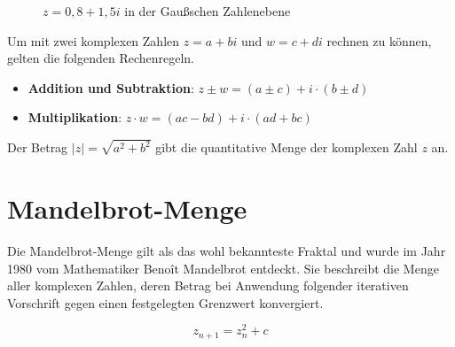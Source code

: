 \begin{figure}[h!]
  \centering
  \caption{$z=0,8 + 1,5i$ in der Gaußschen Zahlenebene}
\end{figure}
\noindent
Um mit zwei komplexen Zahlen $z=a+bi$ und $w=c+di$ rechnen zu können, gelten die folgenden Rechenregeln.
\begin{itemize}
  \item \textbf{Addition und Subtraktion}: $z \pm w = (a \pm c) + i \cdot (b \pm d)$
  \item \textbf{Multiplikation}: $z \cdot w = (ac - bd) + i \cdot (ad + bc)$
\end{itemize}
Der Betrag $\lvert z \rvert = \sqrt{a^{2}+b^{2}} $ gibt die quantitative Menge der komplexen Zahl $z$ an.

\pagebreak

\section{Mandelbrot-Menge}
Die Mandelbrot-Menge gilt als das wohl bekannteste Fraktal und wurde im Jahr
1980 vom Mathematiker Benoît Mandelbrot entdeckt. Sie beschreibt die Menge
aller komplexen Zahlen, deren Betrag bei Anwendung folgender iterativen
Vorschrift gegen einen festgelegten Grenzwert konvergiert.

$$z_{n+1} = z_{n}^{2}+ c$$


